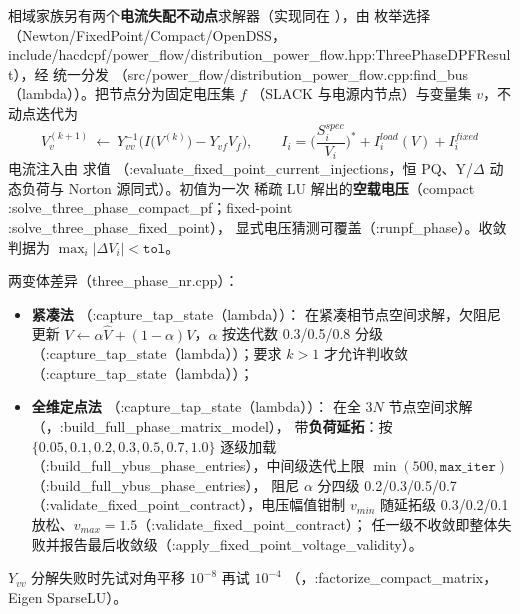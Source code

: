 相域家族另有两个\textbf{电流失配不动点}求解器（实现同在
），由
 枚举选择（Newton/FixedPoint/Compact/OpenDSS，
include/hacdcpf/power\_flow/distribution\_power\_flow.hpp:ThreePhaseDPFResult），经  统一分发
（src/power\_flow/distribution\_power\_flow.cpp:find\_bus（lambda））。把节点分为固定电压集 $f$
（SLACK 与电源内节点）与变量集 $v$，不动点迭代为
\[
V_v^{(k+1)}\ \longleftarrow\ Y_{vv}^{-1}\Big(I\big(V^{(k)}\big)-Y_{vf}V_f\Big),
\qquad I_i=\Big(\frac{S_i^{spec}}{V_i}\Big)^{*}+I_i^{load}(V)+I_i^{fixed}
\]
电流注入由  求值
（:evaluate\_fixed\_point\_current\_injections，恒 PQ、Y/$\Delta$ 动态负荷与 Norton 源同式）。初值为一次
稀疏 LU 解出的\textbf{空载电压}（compact :solve\_three\_phase\_compact\_pf；fixed-point :solve\_three\_phase\_fixed\_point），
显式电压猜测可覆盖（:runpf\_phase）。收敛判据为 $\max_i|\Delta V_i|<\texttt{tol}$。

两变体差异（three\_phase\_nr.cpp）：
\begin{itemize}
  \item \textbf{紧凑法} （:capture\_tap\_state（lambda））：
        在紧凑相节点空间求解，欠阻尼更新
        $V\leftarrow\alpha\hat V+(1-\alpha)V$，$\alpha$ 按迭代数 0.3/0.5/0.8 分级
        （:capture\_tap\_state（lambda））；要求 $k>1$ 才允许判收敛（:capture\_tap\_state（lambda））；
  \item \textbf{全维定点法} （:capture\_tap\_state（lambda））：
        在全 $3N$ 节点空间求解（，:build\_full\_phase\_matrix\_model），
        带\textbf{负荷延拓}：按 $\{0.05,0.1,0.2,0.3,0.5,0.7,1.0\}$ 逐级加载
        （:build\_full\_ybus\_phase\_entries），中间级迭代上限 $\min(500,\texttt{max\_iter})$（:build\_full\_ybus\_phase\_entries），
        阻尼 $\alpha$ 分四级 0.2/0.3/0.5/0.7（:validate\_fixed\_point\_contract），电压幅值钳制
        $v_{min}$ 随延拓级 0.3/0.2/0.1 放松、$v_{max}=1.5$（:validate\_fixed\_point\_contract）；
        任一级不收敛即整体失败并报告最后收敛级（:apply\_fixed\_point\_voltage\_validity）。
\end{itemize}
$Y_{vv}$ 分解失败时先试对角平移 $10^{-8}$ 再试 $10^{-4}$
（，:factorize\_compact\_matrix，Eigen SparseLU）。

